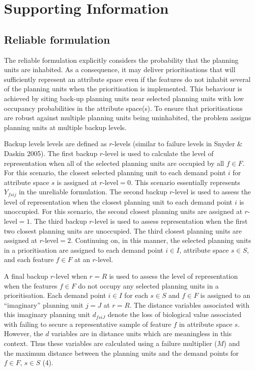 \documentclass[11pt,]{article}
\title{}
\author{}
\date{}
\begin{document}
\maketitle


\section{Supporting Information}\label{supporting-information}

\subsection{Reliable formulation}\label{reliable-formulation}

The reliable formulation explicitly considers the probability that the
planning units are inhabited. As a consequence, it may deliver
prioritisations that will sufficiently represent an attribute space even
if the features do not inhabit several of the planning units when the
prioritisation is implemented. This behaviour is achieved by siting
back-up planning units near selected planning units with low occupancy
probabilities in the attribute space(s). To ensure that prioritisations
are robust against multiple planning units being uninhabited, the
problem assigns planning units at multiple backup levels.

Backup levels levels are defined as $r$-levels (similar to failure
levels in Snyder \& Daskin 2005). The first backup $r$-level is used to
calculate the level of representation when all of the selected planning
units are occupied by all $f \in F$. For this scenario, the closest
selected planning unit to each demand point $i$ for attribute space $s$
is assigned at $r$-level$=0$. This scenario essentially represents
$Y_{fsij}$ in the unreliable formulation. The second backup $r$-level is
used to assess the level of representation when the closest planning
unit to each demand point $i$ is unoccupied. For this scenario, the
second closest planning units are assigned at $r$-level$=1$. The third
backup $r$-level is used to assess representation when the first two
closest planning units are unoccupied. The third closest planning units
are assigned at $r$-level$=2$. Continuing on, in this manner, the
selected planning units in a prioritisation are assigned to each demand
point $i \in I$, attribute space $s \in S$, and each feature $f \in F$
at an $r$-level.

A final backup $r$-level when $r=R$ is used to assess the level of
representation when the features $f \in F$ do not occupy any selected
planning units in a prioritisation. Each demand point $i \in I$ for each
$s \in S$ and $f \in F$ is assigned to an ``imaginary'' planning unit
$j=J$ at $r=R$. The distance variables associated with this imaginary
planning unit $d_{fsiJ}$ denote the loss of biological value associated
with failing to secure a representative sample of feature $f$ in
attribute space $s$. However, the $d$ variables are in distance units
which are meaningless in this context. Thus these variables are
calculated using a failure multiplier ($M$) and the maximum distance
between the planning units and the demand points for $f \in F$,
$s \in S$ (4).
\end{document}
